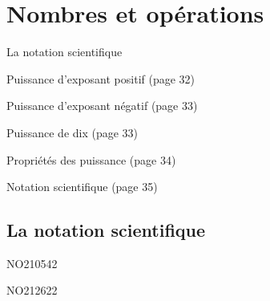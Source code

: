 \documentclass[a4paper,11pt]{report}
\begin{document}
\newcommand{\chapterName}{Nombres et opérations}
\newcommand{\serieName}{La notation scientifique}

\chapter*{\chapterName}
\thispagestyle{empty}

\begin{amL}{\serieName}{
\item Puissance d'exposant positif (page 32)
\item Puissance d'exposant négatif (page 33)
\item Puissance de dix (page 33)
\item Propriétés des puissance (page 34)
\item Notation scientifique (page 35)
}\end{amL}

\section*{\serieName}
\setcounter{page}{1}















\begin{exol}{NO210}{54}{2} %
\end{exol}

\begin{exof}{NO212}{62}{2} %
\end{exof}
\end{document}
